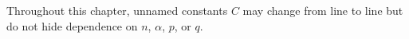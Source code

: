 

Throughout this chapter, unnamed constants \(C\) may change from line to line but
do not hide dependence on \(n\), \(\alpha\), \(p\), or \(q\).
